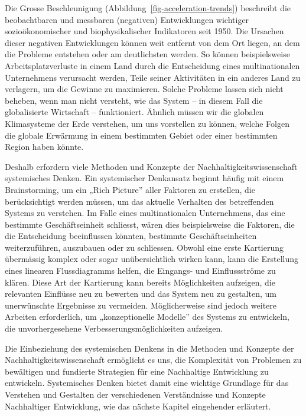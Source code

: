 \documentclass[
  nswissgerman,
  a4paper,
  DIV=11,
  numbers=noendperiod,
  oneside,
  openany]{scrreprt}
\begin{document}
Die Grosse Beschleunigung (Abbildung~\ref{fig-acceleration-trends})
beschreibt die beobachtbaren und messbaren (negativen) Entwicklungen
wichtiger sozioökonomischer und biophysikalischer Indikatoren seit 1950.
Die Ursachen dieser negativen Entwicklungen können weit entfernt von dem
Ort liegen, an dem die Probleme entstehen oder am deutlichsten werden.
So können beispielsweise Arbeitsplatzverluste in einem Land durch die
Entscheidung eines multinationalen Unternehmens verursacht werden, Teile
seiner Aktivitäten in ein anderes Land zu verlagern, um die Gewinne zu
maximieren. Solche Probleme lassen sich nicht beheben, wenn man nicht
versteht, wie das System -- in diesem Fall die globalisierte Wirtschaft
-- funktioniert. Ähnlich müssen wir die globalen Klimasysteme der Erde
verstehen, um uns vorstellen zu können, welche Folgen die globale
Erwärmung in einem bestimmten Gebiet oder einer bestimmten Region haben
könnte.

Deshalb erfordern viele Methoden und Konzepte der
Nachhaltigkeitswissenschaft systemisches Denken. Ein systemischer
Denkansatz beginnt häufig mit einem Brainstorming, um ein „Rich
Picture'' aller Faktoren zu erstellen, die berücksichtigt werden müssen,
um das aktuelle Verhalten des betreffenden Systems zu verstehen. Im
Falle eines multinationalen Unternehmens, das eine bestimmte
Geschäftseinheit schliesst, wären dies beispielsweise die Faktoren, die
die Entscheidung beeinflussen könnten, bestimmte Geschäftseinheiten
weiterzuführen, auszubauen oder zu schliessen. Obwohl eine erste
Kartierung übermässig komplex oder sogar unübersichtlich wirken kann,
kann die Erstellung eines linearen Flussdiagramms helfen, die Eingangs-
und Einflussströme zu klären. Diese Art der Kartierung kann bereits
Möglichkeiten aufzeigen, die relevanten Einflüsse neu zu bewerten und
das System neu zu gestalten, um unerwünschte Ergebnisse zu vermeiden.
Möglicherweise sind jedoch weitere Arbeiten erforderlich, um
„konzeptionelle Modelle'' des Systems zu entwickeln, die
unvorhergesehene Verbesserungsmöglichkeiten aufzeigen.

Die Einbeziehung des systemischen Denkens in die Methoden und Konzepte
der Nachhaltigkeitswissenschaft ermöglicht es uns, die Komplexität von
Problemen zu bewältigen und fundierte Strategien für eine Nachhaltige
Entwicklung zu entwickeln. Systemisches Denken bietet damit eine
wichtige Grundlage für das Verstehen und Gestalten der verschiedenen
Verständnisse und Konzepte Nachhaltiger Entwicklung, wie das nächste
Kapitel eingehender erläutert.
\end{document}
